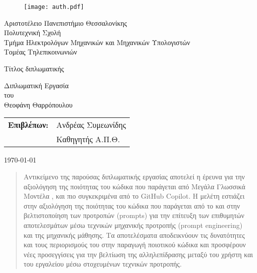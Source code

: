 \begin{titlepage}

  \begin{figure}[H]
    \begin{center}
      \texttt{[image: auth.pdf]}
      \label{fig:cover_auth_logo}
    \end{center}
  \end{figure}

  \centering \Large Αριστοτέλειο Πανεπιστήμιο Θεσσαλονίκης\\ \Large
  Πολυτεχνική Σχολή\\ \large Τμήμα Ηλεκτρολόγων Μηχανικών και Μηχανικών
  Υπολογιστών\\ \large Τομέας Τηλεπικοινωνιών

  \vspace{
    \fill}

  \LARGE Τίτλος διπλωματικής

  \vspace{
    \fill}

  \Large Διπλωματική Εργασία\\ \Large του\\ \Large Θεοφάνη Θαρρόπουλου

  \vspace{
    \fill} \raggedright

  \begin{tabular}{ll}
    \textbf{Επιβλέπων:} & Ανδρέας Συμεωνίδης \\
    & Καθηγητής Α.Π.Θ.\\
  \end{tabular}

  \centering \vspace{
    \fill} \today

\end{titlepage}

\begin{abstract}
  Αντικείμενο της παρούσας διπλωματικής εργασίας αποτελεί η έρευνα για
  την αξιολόγηση της ποιότητας του κώδικα που παράγεται από Μεγάλα
  Γλωσσικά Μοντέλα , και πιο συγκεκριμένα από το
  \textlatin{GitHub Copilot}\cite{githubcopilot}. Η μελέτη εστιάζει στην
  αξιολόγηση της ποιότητας του κώδικα που παράγεται από το  και
  στην βελτιστοποίηση των προτροπών \textlatin{(prompts)} για την
  επίτευξη των επιθυμητών αποτελεσμάτων μέσω τεχνικών μηχανικής
  προτροπής \textlatin{(prompt engineering)} και της μηχανικής μάθησης.
  Τα αποτελέσματα αποδεικνύουν τις δυνατότητες και τους περιορισμούς του
   στην παραγωγή ποιοτικού κώδικα και προσφέρουν νέες
  προσεγγίσεις για την βελτίωση της αλληλεπίδρασης μεταξύ του χρήστη και
  του εργαλείου μέσω στοχευμένων τεχνικών προτροπής.
\end{abstract}


